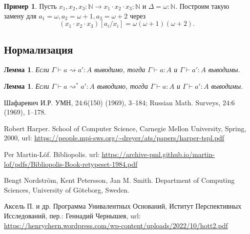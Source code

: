 \documentclass[openany]{book}
\theoremstyle{plain}
\newtheorem{lem}[thm]{Лемма}
\theoremstyle{definition}
\newtheorem{eg}{Пример}[]
\newcommand{\N}{\mathbb{N}}
\begin{document}
\begin{eg}
Пусть \(x_1, x_2, x_3 : \N \to x_1 \cdot x_2 \cdot x_3 : \N\) и \(\Delta = \omega : \N\). Построим такую замену для \(a_1 = \omega, a_2 = \omega + 1, a_3 = \omega + 2\) через \[(x_1 \cdot x_2 \cdot x_3)[a_i/x_i] = \omega (\omega + 1)(\omega + 2).\]
\end{eg}

\subsection{Нормализация}

\begin{lem}
Если \(\Gamma \vdash a \rightsquigarrow a' : A\) выводимо, тогда \(\Gamma \vdash a : A\) и \(\Gamma \vdash a' : A\) выводимы.
\end{lem}

\begin{lem}
Если \(\Gamma \vdash a \rightsquigarrow^* a' : A\) выводимо, тогда \(\Gamma \vdash a : A\) и \(\Gamma \vdash a' : A\) выводимы.
\end{lem}

\begin{thebibliography}{2}

    Шафаревич И.Р.
    \newblock УМН, 24:6(150) (1969), 3–184; Russian Math. Surveys, 24:6 (1969), 1–178.

    Robert Harper.
    \newblock School of Computer Science, Carnegie Mellon University, Spring, 2000,
    \newblock url: \url{https://people.mpi-sws.org/~dreyer/ats/papers/harper-tspl.pdf}

    Per Martin-L\"{o}f.
    \newblock Bibliopolis.
    \newblock url: \url{https://archive-pml.github.io/martin-lof/pdfs/Bibliopolis-Book-retypeset-1984.pdf}

    Bengt Nordstr\"{o}m, Kent Petersson, Jan M. Smith.
    \newblock Department of Computing Sciences, University of G\"{o}teborg, Sweden.

    \bibitem{}
    Аксель П. и др.
    \newblock Программа Унивалентных Оснований, Иститут Перспективных Исследований, пер.: Геннадий Чернышев,
    \newblock url: \url{https://henrychern.wordpress.com/wp-content/uploads/2022/10/hott2.pdf}

\end{thebibliography}
\end{document}
